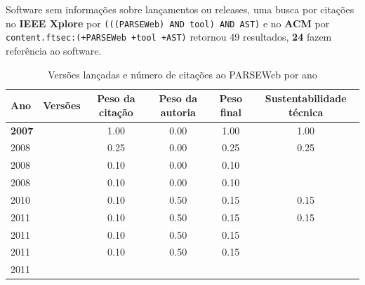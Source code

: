 Software sem informações sobre lançamentos ou releases,
uma busca por citações no {\bf IEEE Xplore} por
\texttt{(((PARSEWeb) AND tool) AND AST)}
e no {\bf ACM} por
\texttt{content.ftsec:(+PARSEWeb +tool +AST)}
retornou
49 resultados,
{\bf 24} fazem referência ao software.


\begin{table}[H]
\caption{Versões lançadas e número de citações ao PARSEWeb por ano}
\centering
\begin{tabular}{| l | c | c | c | c | c |}
  \hline
  Ano & Versões & Peso da citação & Peso da autoria & Peso final & Sustentabilidade técnica \\
  \hline
            {\bf 2007}
          &
          
          &
          1.00
          &
          0.00
          &
          1.00
          &
            {\color{blue} 1.00}
          \\
\hline
            2008
          &
          
          &
          0.25
          &
          0.00
          &
          0.25
          &
            {\color{red} 0.25}
          \\
            2008
          &
          
          &
          0.10
          &
          0.00
          &
          0.10
          &
          \\
            2008
          &
          
          &
          0.10
          &
          0.00
          &
          0.10
          &
          \\
\hline
            2010
          &
          
          &
          0.10
          &
          0.50
          &
          0.15
          &
            {\color{red} 0.15}
          \\
\hline
            2011
          &
          
          &
          0.10
          &
          0.50
          &
          0.15
          &
            {\color{red} 0.15}
          \\
            2011
          &
          
          &
          0.10
          &
          0.50
          &
          0.15
          &
          \\
            2011
          &
          
          &
          0.10
          &
          0.50
          &
          0.15
          &
          \\
            2011
          &
          

\end{tabular}
\end{table}
